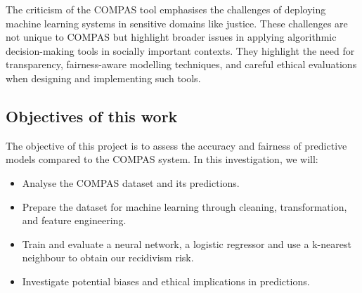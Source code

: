 The criticism of the COMPAS tool emphasises the challenges of deploying machine learning systems in sensitive domains like justice. These challenges are not unique to COMPAS but highlight broader issues in applying algorithmic decision-making tools in socially important contexts. They highlight the need for transparency, fairness-aware modelling techniques, and careful ethical evaluations when designing and implementing such tools.

\subsection{Objectives of this work}

The objective of this project is to assess the accuracy and fairness of predictive models compared to the COMPAS system. In this investigation, we will:

\begin{itemize}[]
	\item Analyse the COMPAS dataset and its predictions.
	\item Prepare the dataset for machine learning through cleaning, transformation, and feature engineering.
	\item Train and evaluate a neural network, a logistic regressor and use a k-nearest neighbour to obtain our recidivism risk.
	\item Investigate potential biases and ethical implications in predictions.
\end{itemize}